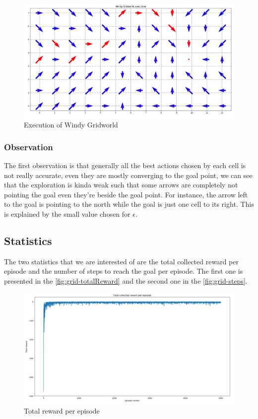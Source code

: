 \documentclass{article}
\begin{document}
\begin{figure}[H]
  \centering
  \includegraphics[scale=0.35]{fig/grid-path.png}
  \caption{Execution of Windy Gridworld}
  \label{fig:grid-path}
\end{figure}

\subsubsection{Observation} 
The first observation is that generally all the best actions chosen by each cell is not really accurate, even they are mostly converging to the goal point, we can see that the exploration is kinda weak such that some arrows are completely not pointing the goal even they're beside the goal point. For instance, the arrow left to the goal is pointing to the north while the goal is just one cell to its right. This is explained by the small value chosen for $\epsilon$.   

\subsection{Statistics}
The two statistics that we are interested of are the total collected reward per episode and the number of steps to reach the goal per episode. The first one is presented in the \autoref{fig:grid-totalReward} and the second one in the \autoref{fig:grid-steps}. 

\begin{figure}[H]
  \centering
  \includegraphics[scale=0.35]{fig/grid-totalReward.png}
  \caption{Total reward per episode}
  \label{fig:grid-totalReward}
\end{figure}
\end{document}
